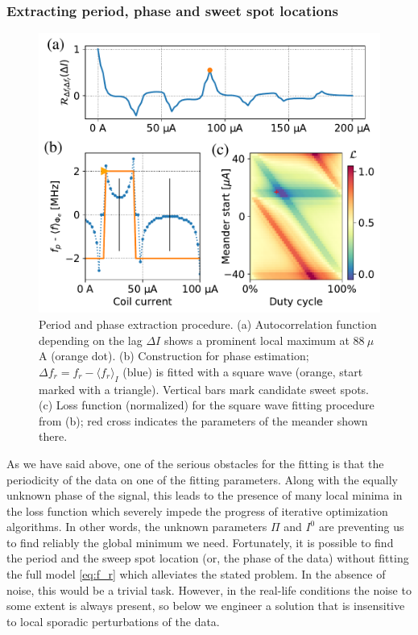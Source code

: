 \documentclass[%
 aip,
 amsmath,amssymb,
 reprint,%
]{revtex4-1}
\begin{document}
\subsubsection{Extracting period, phase and sweet spot locations}
\begin{figure}
\centering
\includegraphics[width=\linewidth]{per+phase}
\caption{Period and phase extraction procedure. (a) Autocorrelation function depending on the lag $\Delta I$ shows a prominent local maximum at $88\ \mu$A (orange dot). (b) Construction for phase estimation; $\Delta f_r = f_r-\langle f_r \rangle_{I}$ (blue) is fitted with a square wave (orange, start marked with a triangle). Vertical bars mark candidate sweet spots. (c) Loss function (normalized) for the square wave fitting procedure from (b); red cross indicates the parameters of the meander shown there.}
\label{fig:per+phase}
\end{figure}
As we have said above, one of the serious obstacles for the fitting is that the periodicity of the data on one of the fitting parameters. Along with the equally unknown phase of the signal, this leads to the presence of many local minima in the loss function which severely impede the progress of iterative optimization algorithms. In other words, the unknown parameters $\Pi$ and $I^0$ are preventing us to find reliably the global minimum we need. Fortunately, it is possible to find the period and the sweep spot location (or, the phase of the data) without fitting the full model \eqref{eq:f_r} which alleviates the stated problem. In the absence of noise, this would be a trivial task. However, in the real-life conditions the noise to some extent is always present, so below we engineer a solution that is insensitive to local sporadic perturbations of the data.
\end{document}

